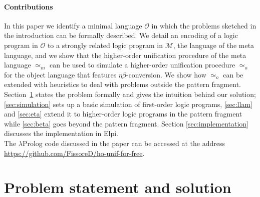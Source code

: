 \documentclass[sigconf,natbib=false,review]{acmart}
\def\githubUrl{\url{https://github.com/FissoreD/ho-unif-for-free}}
\newcommand{\UnifRel}{\ensuremath{\simeq}}
\newcommand{\Uo}{\texorpdfstring{\ensuremath{\UnifRel_o}\xspace}{unif\_o}}
\newcommand{\Ue}{\ensuremath{\UnifRel_m}\xspace}
\newcommand{\llambda}{\ensuremath{\mathcal{L}}\xspace}
\newcommand{\Fo}{\texorpdfstring{\ensuremath{\mathcal{O}}\xspace}{O}}
\newcommand{\Ho}{\texorpdfstring{\ensuremath{\mathcal{M}}\xspace}{M}}
\begin{document}
\paragraph{Contributions}
In this paper we identify a minimal language \Fo{} in which the problems
sketched in the introduction can be formally described.
We detail an encoding of a logic program in \Fo{} to a strongly related
logic program in \Ho, the language of the meta language, and we show that
the higher-order unification procedure of the meta language \Ue{} can be
used to simulate a higher-order unification procedure \Uo for
the object language that features $\eta\beta$-conversion. We show how \Uo
can be extended with heuristics to deal with problems outside the pattern
fragment.\\
Section~\ref{sec:problem-statement} states the problem formally and gives the
intuition behind our solution; \cref{sec:simulation} sets up a basic
simulation of first-order logic programs, \cref{sec:llam} and \cref{sec:eta}
extend it to higher-order logic programs in the pattern fragment
while \cref{sec:beta} goes beyond the pattern fragment.
Section \ref{sec:implementation} discusses the implementation in Elpi.\\
The $\lambda$Prolog code discussed in the paper can be accessed at the
address \githubUrl.

\section{Problem statement and solution} %
\label{sec:problem-statement}

\newcommand{\specunif}[3]{
  \{#3_1, #3_2\} \subseteq \llambda \Rightarrow %
    \exists \rho, %
      \rho #3_1 #1 \rho #3_2  %
        \Leftrightarrow #3_1 #2 #3_2 \mapsto \rho' \subseteq \rho
}


\newcommand{\unifcorrectX}[4]{\ensuremath{
   #4 \Rightarrow
      #3_1 #2 #3_2 \mapsto \rho
        \Rightarrow
          \rho #3_1 #1 \rho #3_2  %
}}
\newcommand{\unifcorrect}[3]{\unifcorrectX{#1}{#2}{#3}{ \{#3_1, #3_2\} \subseteq \llambda}}

\newcommand{\unifcompleteX}[4]{\ensuremath{
    #4 \Rightarrow
        \rho #3_1 #1 \rho #3_2  %
          \Rightarrow \exists \rho', #3_1 #2 #3_2 \mapsto \rho' \land \rho' \subseteq \rho
}}
\newcommand{\unifcomplete}[3]{\unifcompleteX{#1}{#2}{#3}{\{#3_1, #3_2\} \subseteq \llambda}}
\end{document}

